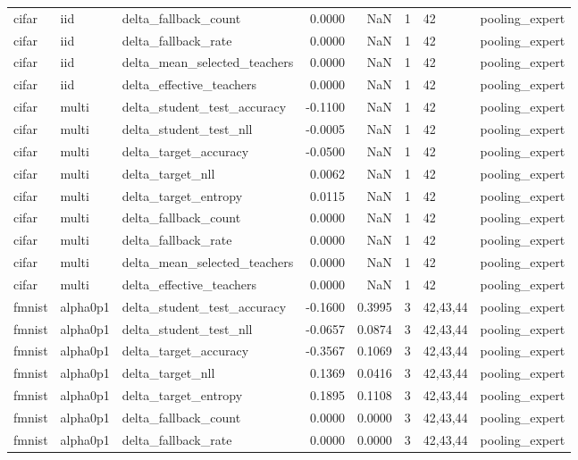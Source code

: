 \begin{tabular}{lllrrrll}
cifar & iid & delta\_fallback\_count & 0.0000 & NaN & 1 & 42 & pooling\_expert \\
cifar & iid & delta\_fallback\_rate & 0.0000 & NaN & 1 & 42 & pooling\_expert \\
cifar & iid & delta\_mean\_selected\_teachers & 0.0000 & NaN & 1 & 42 & pooling\_expert \\
cifar & iid & delta\_effective\_teachers & 0.0000 & NaN & 1 & 42 & pooling\_expert \\
cifar & multi & delta\_student\_test\_accuracy & -0.1100 & NaN & 1 & 42 & pooling\_expert \\
cifar & multi & delta\_student\_test\_nll & -0.0005 & NaN & 1 & 42 & pooling\_expert \\
cifar & multi & delta\_target\_accuracy & -0.0500 & NaN & 1 & 42 & pooling\_expert \\
cifar & multi & delta\_target\_nll & 0.0062 & NaN & 1 & 42 & pooling\_expert \\
cifar & multi & delta\_target\_entropy & 0.0115 & NaN & 1 & 42 & pooling\_expert \\
cifar & multi & delta\_fallback\_count & 0.0000 & NaN & 1 & 42 & pooling\_expert \\
cifar & multi & delta\_fallback\_rate & 0.0000 & NaN & 1 & 42 & pooling\_expert \\
cifar & multi & delta\_mean\_selected\_teachers & 0.0000 & NaN & 1 & 42 & pooling\_expert \\
cifar & multi & delta\_effective\_teachers & 0.0000 & NaN & 1 & 42 & pooling\_expert \\
fmnist & alpha0p1 & delta\_student\_test\_accuracy & -0.1600 & 0.3995 & 3 & 42,43,44 & pooling\_expert \\
fmnist & alpha0p1 & delta\_student\_test\_nll & -0.0657 & 0.0874 & 3 & 42,43,44 & pooling\_expert \\
fmnist & alpha0p1 & delta\_target\_accuracy & -0.3567 & 0.1069 & 3 & 42,43,44 & pooling\_expert \\
fmnist & alpha0p1 & delta\_target\_nll & 0.1369 & 0.0416 & 3 & 42,43,44 & pooling\_expert \\
fmnist & alpha0p1 & delta\_target\_entropy & 0.1895 & 0.1108 & 3 & 42,43,44 & pooling\_expert \\
fmnist & alpha0p1 & delta\_fallback\_count & 0.0000 & 0.0000 & 3 & 42,43,44 & pooling\_expert \\
fmnist & alpha0p1 & delta\_fallback\_rate & 0.0000 & 0.0000 & 3 & 42,43,44 & pooling\_expert \\

\end{tabular}
